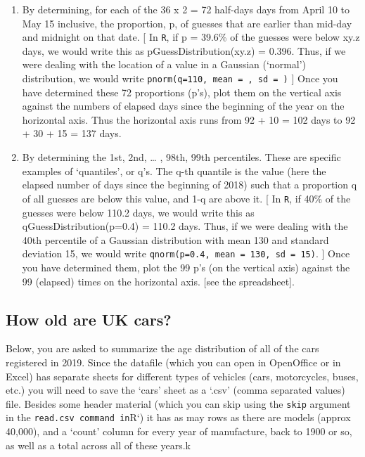 \documentclass[]{book}
\begin{document}
\begin{enumerate}
\def\labelenumi{\arabic{enumi}.}
\item
  By determining, for each of the 36 x 2 = 72 half-days days from April 10 to May 15 inclusive, the proportion, p, of guesses that are earlier than mid-day and midnight on that date. {[} In \texttt{R}, if p = 39.6\% of the guesses were below xy.z days, we would write this as pGuessDistribution(xy.z) = 0.396. Thus, if we were dealing with the location of a value in a Gaussian (`normal') distribution, we would write \texttt{pnorm(q=110,\ mean\ =\ ,\ sd\ =\ )} {]} Once you have determined these 72 proportions (p's), plot them on the vertical axis against the numbers of elapsed days since the beginning of the year on the horizontal axis. Thus the horizontal axis runs from 92 + 10 = 102 days to 92 + 30 + 15 = 137 days.
\item
  By determining the 1st, 2nd, \ldots{} , 98th, 99th percentiles. These are specific examples of `quantiles', or q's. The q-th quantile is the value (here the elapsed number of days since the beginning of 2018) such that a proportion q of all guesses are below this value, and 1-q are above it. {[} In \texttt{R}, if 40\% of the guesses were below 110.2 days, we would write this as qGuessDistribution(p=0.4) = 110.2 days. Thus, if we were dealing with the 40th percentile of a Gaussian distribution with mean 130 and standard deviation 15, we would write \texttt{qnorm(p=0.4,\ mean\ =\ 130,\ sd\ =\ 15)}. {]} Once you have determined them, plot the 99 p's (on the vertical axis) against the 99 (elapsed) times on the horizontal axis. {[}see the spreadsheet{]}.
\end{enumerate}

\hypertarget{how-old-are-uk-cars}{%
\subsection{How old are UK cars?}\label{how-old-are-uk-cars}}

Below, you are asked to summarize the age distribution of all of the cars registered in 2019. Since the datafile (which you can open in OpenOffice or in Excel) has separate sheets for different types of vehicles (cars, motorcycles, buses, etc.) you will need to save the `cars' sheet as a `.csv' (comma separated values) file. Besides some header material (which you can skip using the \texttt{skip} argument in the \texttt{read.csv\textquotesingle{}\ command\ in}R`) it has as may rows as there are models (approx 40,000), and a `count' column for every year of manufacture, back to 1900 or so, as well as a total across all of these years.k
\end{document}
